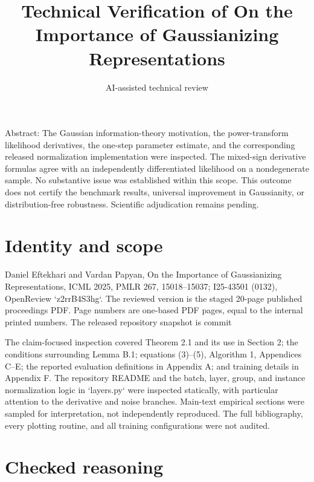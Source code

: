 \documentclass[10pt]{article}
\title{Technical Verification of
On the Importance of Gaussianizing Representations}
\author{AI-assisted technical review}
\date{}
\begin{document}
\maketitle
Abstract: The Gaussian information-theory motivation, the power-transform likelihood derivatives, the one-step parameter estimate, and the corresponding released normalization implementation were inspected. The mixed-sign derivative formulas agree with an independently differentiated likelihood on a nondegenerate sample. No substantive issue was established within this scope. This outcome does not certify the benchmark results, universal improvement in Gaussianity, or distribution-free robustness. Scientific adjudication remains pending.\par
\section*{Identity and scope}
Daniel Eftekhari and Vardan Papyan, On the Importance of Gaussianizing Representations, ICML 2025, PMLR 267, 15018–15037; I25-43501 (0132), OpenReview `z2rrB4S3hg`. The reviewed version is the staged 20-page published proceedings PDF. Page numbers are one-based PDF pages, equal to the internal printed numbers. The released repository snapshot is commit\par
The claim-focused inspection covered Theorem 2.1 and its use in Section 2; the conditions surrounding Lemma B.1; equations (3)–(5), Algorithm 1, Appendices C–E; the reported evaluation definitions in Appendix A; and training details in Appendix F. The repository README and the batch, layer, group, and instance normalization logic in `layers.py` were inspected statically, with particular attention to the derivative and noise branches. Main-text empirical sections were sampled for interpretation, not independently reproduced. The full bibliography, every plotting routine, and all training configurations were not audited.\par
\section*{Checked reasoning}
\end{document}
